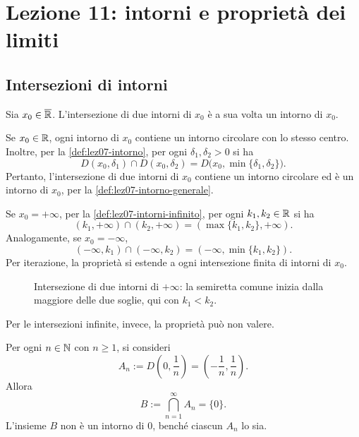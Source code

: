 \chapter[Lezione 11 --- 21 ottobre 2026]{Lezione 11: intorni e proprietà dei limiti}
\label{chap:lezione-11}

\section{Intersezioni di intorni}
\label{sec:lez11-intersezione-intorni}

Sia \(x_0\in\overline{\mathbb{R}}\). L'intersezione di due intorni di
\(x_0\) è a sua volta un intorno di \(x_0\).

Se \(x_0\in\mathbb{R}\), ogni intorno di \(x_0\) contiene un intorno
circolare con lo stesso centro. Inoltre, per la
\cref{def:lez07-intorno}, per ogni \(\delta_1,\delta_2>0\)
si ha
\[
  D(x_0,\delta_1)\cap D(x_0,\delta_2)
  =D\bigl(x_0,\min\{\delta_1,\delta_2\}\bigr).
\]
Pertanto, l'intersezione di due intorni di \(x_0\)
contiene un intorno circolare ed è un intorno
di \(x_0\), per la \cref{def:lez07-intorno-generale}.

Se \(x_0=+\infty\), per la \cref{def:lez07-intorni-infinito},
per ogni \(k_1,k_2\in\mathbb{R}\) si ha
\[
  (k_1,+\infty)\cap(k_2,+\infty)
  =(\max\{k_1,k_2\},+\infty).
\]
Analogamente, se \(x_0=-\infty\),
\[
  (-\infty,k_1)\cap(-\infty,k_2)
  =(-\infty,\min\{k_1,k_2\}).
\]
Per iterazione, la proprietà si estende a ogni intersezione finita
di intorni di \(x_0\).

\begin{figure}[htbp]
  \centering
  
  \caption{Intersezione di due intorni di \(+\infty\):
  la semiretta comune inizia dalla maggiore delle due soglie,
  qui con \(k_1<k_2\).}
  \label{fig:lez11-intersezione-intorni-infinito}
\end{figure}

Per le intersezioni infinite, invece, la proprietà può non valere.

\begin{example}
\label{ex:lez11-intersezione-infinita}
Per ogni \(n\in\mathbb{N}\) con \(n\ge1\), si consideri
\[
  A_n:=D\!\left(0,\frac1n\right)
       =\left(-\frac1n,\frac1n\right).
\]
Allora
\[
  B:=\bigcap_{n=1}^{\infty}A_n=\{0\}.
\]
L'insieme \(B\) non è un intorno di \(0\), benché
ciascun \(A_n\) lo sia.
\end{example}

